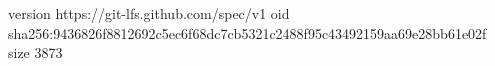 version https://git-lfs.github.com/spec/v1
oid sha256:9436826f8812692c5ec6f68dc7cb5321c2488f95c43492159aa69e28bb61e02f
size 3873
